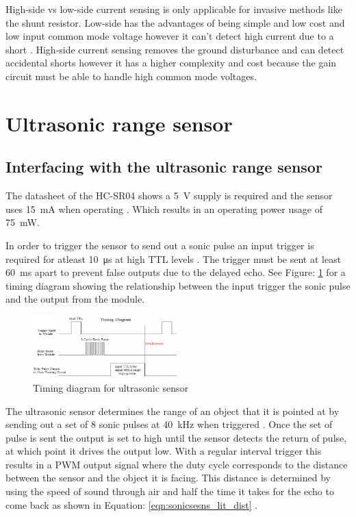 High-side vs low-side current sensing is only applicable for invasive methods like the shunt resistor. Low-side has the advantages of being simple and low cost and low input common mode voltage however it can't detect high current due to a short \cite{EG_CurSens}. High-side current sensing removes the ground disturbance and can detect accidental shorts however it has a higher complexity and cost because the gain circuit must be able to handle high common mode voltages\cite{EG_CurSens}.  

\clearpage
\section{Ultrasonic range sensor}
\subsection{Interfacing with the ultrasonic range sensor}
The datasheet of the HC-SR04 shows a \SI{5}{\volt} supply is required and the sensor uses \SI{15}{\milli\ampere} when operating \cite{Design_SonicSens}. Which results in an operating power usage of \SI{75}{\milli\watt}.


In order to trigger the sensor to send out a sonic pulse an input trigger is required for atleast \SI{10}{\micro\second} at high TTL levels \cite{Design_SonicSens} \cite{Design_SonicSens}. The trigger must be sent at least \SI{60}{\milli\second} apart to prevent false outputs due to the delayed echo\cite{Design_SonicSens}. See Figure: \ref{fig:sonicsen_timing} for a timing diagram showing the relationship between the input trigger the sonic pulse and the output from the module.

\begin{figure}[H]
\centering
\includegraphics[width=0.5\textwidth]{./Figures/SonicSens_Timing.png}
\caption{Timing diagram for ultrasonic sensor\cite{Design_SonicSens}}
\label{fig:sonicsen_timing}	
\end{figure}

The ultrasonic sensor determines the range of an object that it is pointed at by sending out a set of 8 sonic pulses at \SI{40}{\kilo\hertz} when triggered \cite{Design_SonicSens}.  Once the set of pulse is sent the output is set to high until the sensor detects the return of pulse, at which point it drives the output low. With a regular interval trigger this results in a PWM output signal where the duty cycle corresponds to the distance between the sensor and the object it is facing. This distance is determined by using the speed of sound through air and half the time it takes for the echo to come back as shown in Equation: \ref{eqn:sonicsesns_lit_dist} \cite{Design_SonicSens}.

